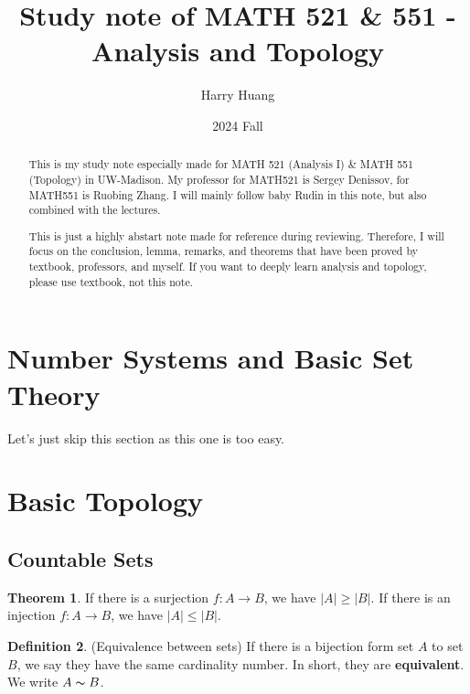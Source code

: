 \documentclass[12pt,a4paper]{article}
\author{Harry Huang}
\title{Study note of MATH 521 \& 551 - Analysis and Topology}
\date{2024 Fall}
\theoremstyle{definition}
\newtheorem{thm}{Theorem}[subsection]
\newtheorem{dfn}[thm]{Definition}
\begin{document}
\maketitle

\begin{abstract}
    This is my study note especially made for MATH 521 (Analysis I) \& MATH 551 (Topology) in UW-Madison. My professor for MATH521 is Sergey Denissov, for MATH551 is Ruobing Zhang. I will mainly follow baby Rudin in this note, but also combined with the lectures.
    \par This is just a highly abstart note made for reference during reviewing. Therefore, I will focus on the conclusion, lemma, remarks, and theorems that have been proved by textbook, professors, and myself. If you want to deeply learn analysis and topology, please use textbook, not this note.
\end{abstract}

\section{Number Systems and Basic Set Theory}

Let's just skip this section as this one is too easy.

\section{Basic Topology}

\subsection{Countable Sets}

\begin {thm}
    If there is a surjection $f: A \rightarrow B$, we have $|A| \geq |B|$. If there is an injection $f: A \rightarrow B$, we have $|A| \leq |B|$. 
\end {thm}

\begin{dfn} (Equivalence between sets)
    \hspace{0em}
    If there is a bijection form set $A$ to set $B$, we say they have the same cardinality number.
    In short, they are \textbf{equivalent}. We write $A \thicksim B$.
\end{dfn}
\end{document}

